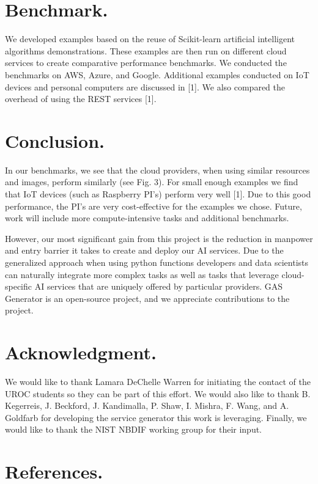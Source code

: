 \documentclass[letter,10pt]{article}
\begin{document}
\begin{multicols}{3}
\section*{Benchmark.}

We developed examples based on the reuse of Scikit-learn artificial intelligent algorithms demonstrations. These examples are then run on different cloud services to create comparative performance benchmarks. We conducted the benchmarks on 
AWS, Azure, and Google. Additional examples conducted on IoT devices and personal computers are discussed in [1]. We also compared the overhead of using the REST services [1].


\section*{Conclusion.}

In our benchmarks, we see that the cloud providers, when using similar resources and images, perform similarly (see Fig. 3). For small enough examples we find that IoT devices (such as Raspberry PI's) perform very well [1]. Due to this good performance, the PI's are very cost-effective for the examples we chose.
Future, work will include more compute-intensive tasks and additional benchmarks.

However, our most significant gain from this project is the reduction in manpower and entry barrier it takes to create and deploy our AI services. Due to the generalized approach when using python functions developers and data scientists can naturally integrate more complex tasks as well as tasks that leverage cloud-specific AI services that are uniquely offered by particular providers. GAS Generator is an open-source project, and we appreciate contributions to the project. 

\section*{Acknowledgment.} We would like to thank Lamara DeChelle Warren for initiating the contact of the UROC students so they can be part of this effort. 
We would also like to thank
B. Kegerreis,
J. Beckford,
J. Kandimalla,
P. Shaw,
I. Mishra,
F. Wang, and A. Goldfarb for developing the service generator this work is leveraging. Finally, we would like to thank the NIST NBDIF working group for their input.

\section*{References.}


\end{multicols}
\end{document}
